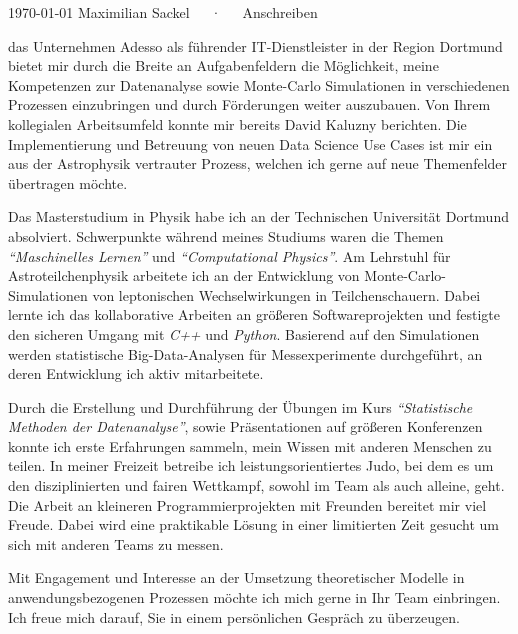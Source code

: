 \documentclass[11pt, a4paper]{Awesome-CV/awesome-cv}
\begin{document}
\makecvheader[R]

\makecvfooter
{\today}
{Maximilian Sackel~~~·~~~Anschreiben}
{}

\makelettertitle

\begin{cvletter}
    das Unternehmen Adesso als führender IT-Dienstleister in der Region Dortmund
    bietet mir durch die Breite an Aufgabenfeldern die Möglichkeit, meine
    Kompetenzen zur Datenanalyse sowie Monte-Carlo Simulationen in verschiedenen Prozessen einzubringen und durch Förderungen weiter auszubauen.
    Von Ihrem kollegialen Arbeitsumfeld konnte mir bereits David Kaluzny berichten.
    Die Implementierung und Betreuung von neuen Data Science Use Cases ist mir
    ein aus der Astrophysik vertrauter Prozess, welchen ich gerne auf neue Themenfelder übertragen möchte.

    Das Masterstudium in Physik habe ich an der Technischen Universität Dortmund absolviert.
    Schwerpunkte während meines Studiums waren die Themen \textit{``Maschinelles Lernen''} und \textit{``Computational Physics''}.
    Am Lehrstuhl für Astroteilchenphysik arbeitete ich an der Entwicklung von Monte-Carlo-Simulationen von leptonischen Wechselwirkungen in Teilchenschauern.
    Dabei lernte ich das kollaborative Arbeiten an größeren Softwareprojekten und festigte den sicheren Umgang mit \textit{C++} und \textit{Python}.
    Basierend auf den Simulationen werden statistische Big-Data-Analysen für
    Messexperimente durchgeführt, an deren Entwicklung ich aktiv mitarbeitete.

    Durch die Erstellung und Durchführung der Übungen im Kurs
    \textit{``Statistische Methoden der Datenanalyse''}, sowie Präsentationen
    auf größeren Konferenzen konnte ich erste Erfahrungen sammeln, mein Wissen mit anderen Menschen zu teilen.
    In meiner Freizeit betreibe ich leistungsorientiertes Judo, bei dem es um
    den disziplinierten und fairen Wettkampf, sowohl im Team als auch alleine, geht.
    Die Arbeit an kleineren Programmierprojekten mit Freunden bereitet mir viel Freude.
    Dabei wird eine praktikable Lösung in einer limitierten Zeit gesucht um sich
    mit anderen Teams zu messen.

    Mit Engagement und Interesse an der Umsetzung theoretischer Modelle in
    anwendungsbezogenen Prozessen möchte ich mich gerne in Ihr Team einbringen.
    Ich freue mich darauf, Sie in einem persönlichen Gespräch zu überzeugen.

\end{cvletter}


\makeletterclosing
\end{document}

